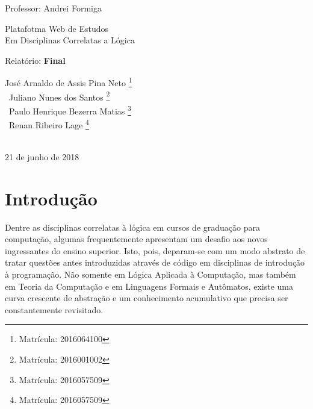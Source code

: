 \documentclass[11pt, a4paper]{article}
\begin{document}
\begin{titlepage}
\begin{center}
    	    {\sc Professor: Andrei Formiga}

	        \vspace{4cm}

        	{\LARGE \sc Platafotma Web de Estudos \\ {\Large Em Disciplinas Correlatas a Lógica} \\}

					\vspace{3cm}

	        \begin{flushleft}

            	{\sf \sc \large Relatório: \bf{Final} \\}

        	\end{flushleft}

    	    \vspace{2cm}

	        \begin{flushleft}

            	{\sf {} José Arnaldo de Assis Pina Neto 									\footnote{Matrícula: 2016064100}\\
							\qquad \quad \, 			Juliano Nunes dos Santos
																		\footnote{Matrícula: 2016001002}\\
							\qquad \quad \, 			Paulo Henrique Bezerra Matias
																		\footnote{Matrícula: 2016057509}\\
							\qquad \quad \,				Renan Ribeiro Lage
																		\footnote{Matrícula: 2016057509}}

        	\end{flushleft}

    	    \vspace{1.5cm}

	         \\
        	21 de junho de 2018

    	\end{center}
	\end{titlepage}


	\pagebreak


	\section{Introdução}

		Dentre as disciplinas correlatas à lógica em cursos de graduação para computação, algumas frequentemente apresentam um desafio aos novos ingressantes do ensino superior. Isto, pois, deparam-se com um modo abstrato de tratar questões antes introduzidas através de código em disciplinas de introdução à programação. Não somente em Lógica Aplicada à Computação, mas também em Teoria da Computação e em Linguagens Formais e Autômatos, existe uma curva crescente de abstração e um conhecimento acumulativo que precisa ser constantemente revisitado.\\
\end{document}
